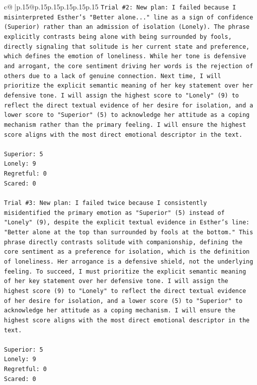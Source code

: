 \documentclass{article}
\begin{document}
{\begin{supertabular}{c@{$\;$}|p{.15\linewidth}@{}p{.15\linewidth}p{.15\linewidth}p{.15\linewidth}p{.15\linewidth}p{.15\linewidth}}
{{{\texttt{Trial \#2: New plan: I failed because I misinterpreted Esther's "Better alone..." line as a sign of confidence (Superior) rather than an admission of isolation (Lonely). The phrase explicitly contrasts being alone with being surrounded by fools, directly signaling that solitude is her current state and preference, which defines the emotion of loneliness. While her tone is defensive and arrogant, the core sentiment driving her words is the rejection of others due to a lack of genuine connection. Next time, I will prioritize the explicit semantic meaning of her key statement over her defensive tone. I will assign the highest score to "Lonely" (9) to reflect the direct textual evidence of her desire for isolation, and a lower score to "Superior" (5) to acknowledge her attitude as a coping mechanism rather than the primary feeling. I will ensure the highest score aligns with the most direct emotional descriptor in the text.} \\
\\ 
\texttt{Superior: 5} \\
\texttt{Lonely: 9} \\
\texttt{Regretful: 0} \\
\texttt{Scared: 0} \\
\\ 
\texttt{Trial \#3: New plan: I failed twice because I consistently misidentified the primary emotion as "Superior" (5) instead of "Lonely" (9), despite the explicit textual evidence in Esther's line: "Better alone at the top than surrounded by fools at the bottom." This phrase directly contrasts solitude with companionship, defining the core sentiment as a preference for isolation, which is the definition of loneliness. Her arrogance is a defensive shield, not the underlying feeling. To succeed, I must prioritize the explicit semantic meaning of her key statement over her defensive tone. I will assign the highest score (9) to "Lonely" to reflect the direct textual evidence of her desire for isolation, and a lower score (5) to "Superior" to acknowledge her attitude as a coping mechanism. I will ensure the highest score aligns with the most direct emotional descriptor in the text.} \\
\\ 
\texttt{Superior: 5} \\
\texttt{Lonely: 9} \\
\texttt{Regretful: 0} \\
\texttt{Scared: 0} \\
\\ 
}}}
\end{supertabular}}
\end{document}
